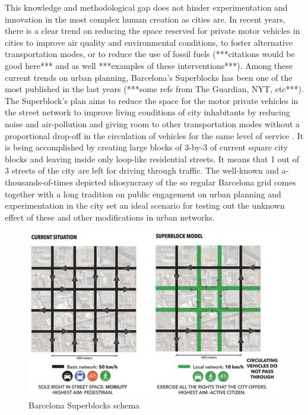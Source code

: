 \documentclass[11pt]{article}
\begin{document}
This knowledge and methodological gap does not hinder experimentation and innovation in the most complex human creation \citep{Levi-Strauss1955} as cities are. In recent years, there is a clear trend on reducing the space reserved for private motor vehicles in cities to improve air quality and environmental conditions, to foster alternative transportation modes, or to reduce the use of fossil fuels (***citations would be good here*** and as well ***examples of these interventions***). Among these current trends on urban planning, Barcelona's Superblocks has been one of the most published in the last years (***some refs from The Guardian, NYT, etc***). The Superblock's plan aims to reduce the space for the motor private vehicles in the street network to improve living conditions of city inhabitants by reducing noise and air-pollution and giving room to other transportation modes without a proportional drop-off in the circulation of vehicles for the same level of service \citep{Rueda2018}. It is being accomplished by creating large blocks of 3-by-3 of current square city blocks and leaving inside only loop-like residential streets. It means that 1 out of 3 streets of the city are left for driving through traffic. The well-known and a-thousands-of-times depicted idiosyncrasy of the so regular Barcelona grid comes together with a long tradition on public engagement on urban planning and experimentation in the city set an ideal scenario for testing out the unknown effect of these and other modifications in urban networks.

\begin{figure}[h]
\centering
\includegraphics[scale=0.5]{bcn_superblocks_rueda_2018.png}
\caption{Barcelona Superblocks schema \citep{Rueda2018}}
\label{fig:Barcelona Superblocks schema}
\end{figure}
\end{document}
